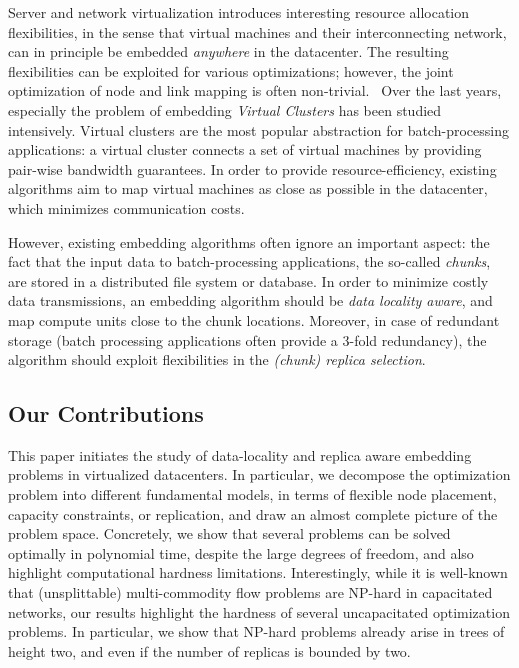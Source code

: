 \documentclass[9pt,twocolumn]{scrartcl}
\begin{document}
Server and network virtualization introduces interesting resource allocation flexibilities,
in the sense that virtual machines and their interconnecting network,
can in principle be embedded \emph{anywhere} in the datacenter. The resulting flexibilities
can be exploited for various optimizations;
however, the joint optimization of node and link mapping is often non-trivial.~\cite{pb-embed}
Over the last years, especially the problem of embedding
\emph{Virtual Clusters} has been studied intensively. Virtual clusters are the most popular abstraction for batch-processing applications:
a virtual cluster connects a set of virtual machines by providing pair-wise bandwidth guarantees.
In order to provide resource-efficiency, existing algorithms aim to map virtual machines as close as possible
in the datacenter, which minimizes communication costs.~\cite{oktopus,proteus}

However, existing embedding algorithms often ignore an important aspect: the fact that the input data
to batch-processing applications,
the so-called \emph{chunks}, are stored in a distributed file system or database. In order to minimize
costly data transmissions, an embedding algorithm should be \emph{data locality aware},
and map compute units close to the chunk locations. Moreover, in case of redundant storage (batch processing
applications often provide a 3-fold redundancy), the algorithm should exploit flexibilities in
the \emph{(chunk) replica selection}.

\subsection{Our Contributions}

This paper initiates the study of data-locality and replica aware embedding problems in virtualized datacenters.
In particular, we decompose the optimization problem into different fundamental models, in terms of flexible
node placement, capacity constraints, or replication,
and draw an almost complete picture of the problem space. Concretely, we show that several problems
can be solved optimally in polynomial time, despite the large degrees of freedom, and also highlight
computational hardness limitations. Interestingly, while it is well-known that (unsplittable) multi-commodity flow
problems are NP-hard in capacitated networks, our results highlight the hardness of several uncapacitated
optimization problems. In particular, we show that NP-hard problems already arise in trees of height two,
and even if the number of replicas is bounded by two.
\end{document}
